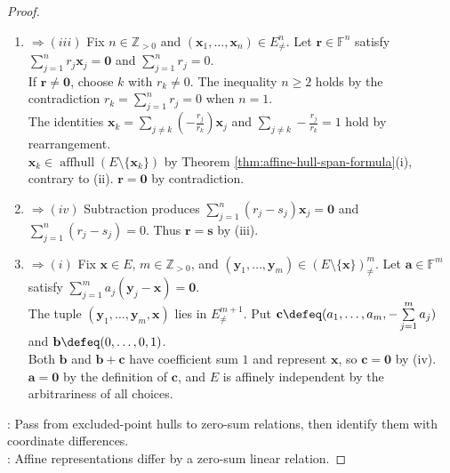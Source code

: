 \begin{theorem}
\begin{proof}
\begin{enumerate}[label=(\roman*)]
By Theorem \ref{thm:affine-hull-span-formula}(i), $\mathbf{x}\in\operatorname{affspan}(E\setminus\{\mathbf{x}\})$. Collect the repeated points in an affine representation of $\mathbf{x}$.\\
Fix $m\in\mathbb{Z}_{>0}$ and $(\mathbf{y}_1,\ldots,\mathbf{y}_m)\in(E\setminus\{\mathbf{x}\})_{\neq}^m$ as its distinct points.\\
The collected coefficients form $\mathbf{r}\in\mathbb{F}^m$ with $\mathbf{x}=\sum\limits_{j=1}^m r_j\mathbf{y}_j$ and $\sum\limits_{j=1}^m r_j=1$.\\
The relation $\sum\limits_{j=1}^m r_j(\mathbf{y}_j-\mathbf{x})=\mathbf{0}$ with $\mathbf{r}\neq\mathbf{0}$ holds by these identities, contradicting (i). 
\item[$(ii)$]$\Rightarrow (iii)$ Fix $n\in\mathbb{Z}_{>0}$ and $(\mathbf{x}_1,\ldots,\mathbf{x}_n)\in E_{\neq}^n$. Let $\mathbf{r}\in\mathbb{F}^n$ satisfy $\sum\limits_{j=1}^n r_j\mathbf{x}_j=\mathbf{0}$ and $\sum\limits_{j=1}^n r_j=0$.\\
If $\mathbf{r}\neq\mathbf{0}$, choose $k$ with $r_k\neq0$. The inequality $n\geq2$ holds by the contradiction $r_k=\sum\limits_{j=1}^n r_j=0$ when $n=1$.\\
The identities $\mathbf{x}_k=\sum\limits_{j\neq k}(-\frac{r_j}{r_k})\mathbf{x}_j$ and $\sum\limits_{j\neq k}-\frac{r_j}{r_k}=1$ hold by rearrangement.\\
$\mathbf{x}_k\in\operatorname{affhull}(E\setminus\{\mathbf{x}_k\})$ by Theorem \ref{thm:affine-hull-span-formula}(i), contrary to (ii). $\mathbf{r}=\mathbf{0}$ by contradiction. 
\item[$(iii)$]$\Rightarrow (iv)$ Subtraction produces $\sum\limits_{j=1}^n(r_j-s_j)\mathbf{x}_j=\mathbf{0}$ and $\sum\limits_{j=1}^n(r_j-s_j)=0$. Thus $\mathbf{r}=\mathbf{s}$ by (iii). \item[$(iv)$]$\Rightarrow (i)$ Fix $\mathbf{x}\in E$, $m\in\mathbb{Z}_{>0}$, and $(\mathbf{y}_1,\ldots,\mathbf{y}_m)\in(E\setminus\{\mathbf{x}\})_{\neq}^m$. Let $\mathbf{a}\in\mathbb{F}^m$ satisfy $\sum\limits_{j=1}^m a_j(\mathbf{y}_j-\mathbf{x})=\mathbf{0}$.\\
The tuple $(\mathbf{y}_1,\ldots,\mathbf{y}_m,\mathbf{x})$ lies in $E_{\neq}^{m+1}$. Put $\mathbf{c}\defeq(a_1,\ldots,a_m,-\sum\limits_{j=1}^m a_j)$ and $\mathbf{b}\defeq(0,\ldots,0,1)$.\\
Both $\mathbf{b}$ and $\mathbf{b}+\mathbf{c}$ have coefficient sum $1$ and represent $\mathbf{x}$, so $\mathbf{c}=\mathbf{0}$ by (iv).\\
$\mathbf{a}=\mathbf{0}$ by the definition of $\mathbf{c}$, and $E$ is affinely independent by the arbitrariness of all choices.
\end{enumerate}
: Pass from excluded-point hulls to zero-sum relations, then identify them with coordinate differences.\\
: Affine representations differ by a zero-sum linear relation.
\end{proof}
\end{theorem}

